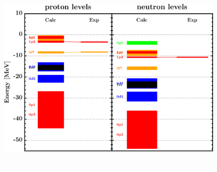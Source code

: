 \documentclass[twocolumn,secnumarabic,amssymb, nobibnotes, aps, prl,
superscriptaddress, nobalancelastpage, draft]{revtex4}
\begin{document}
\begin{figure}[!htb]
\begin{minipage}{0.4\linewidth}
        \label{DOM_ni58_chargeDensity}
    \end{minipage}
    \begin{minipage}{0.35\linewidth}
        \centering
        \includegraphics[width=\linewidth]{figures/ni58_SPLevels.png}
        \label{DOM_ni58_SPLevels}
    \end{minipage}
    \begin{minipage}{0.4\linewidth}
        \centering
        \includegraphics[width=\linewidth]{figures/ni58_RMSRadius.png}

\end{minipage}
\end{figure}
\end{document}
